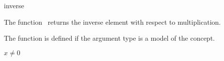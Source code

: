 \begin{ccRefFunction}{inverse}

\ccDefinition

The function \ccRefName\ returns the inverse element with respect to multiplication.

The function is defined if the argument type 
is a model of the  concept. 


{\ccPrecond $x \neq 0$}



\ccSeeAlso

\\
\\

\end{ccRefFunction}

